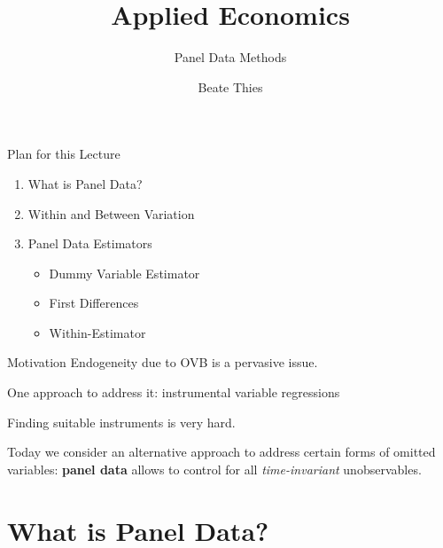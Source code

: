 \documentclass[11pt, aspectratio = 169]{beamer}
\title{Applied Economics}
\subtitle{Panel Data Methods}
\author{Beate Thies}
\date{}
\institute{Winter 2024/25}
\begin{document}

\maketitle

\begin{frame}{Plan for this Lecture}
\begin{enumerate}

\item What is Panel Data?

\item  Within and Between Variation

\item Panel Data Estimators
\begin{itemize}
\item Dummy Variable Estimator
\item First Differences
\item Within-Estimator 
\end{itemize}
\end{enumerate}
\end{frame}

\begin{frame}{Motivation}
Endogeneity due to OVB is a pervasive issue.

One approach to address it: instrumental variable regressions

Finding suitable instruments is very hard.

Today we consider an alternative approach to address certain forms of omitted variables: 
\textbf{panel data} allows to control for all \textit{time-invariant} unobservables.

\end{frame}

\section{What is Panel Data?}
\end{document}
